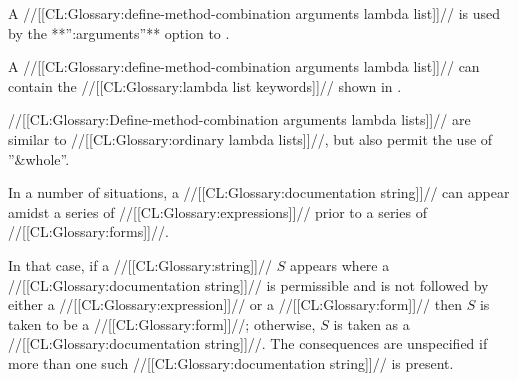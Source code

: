 \endsubsection%



A //[[CL:Glossary:define-method-combination arguments lambda list]]// is used by 
the **'':arguments''** option to .

A //[[CL:Glossary:define-method-combination arguments lambda list]]// can contain the 
//[[CL:Glossary:lambda list keywords]]// shown in \thenextfigure.


//[[CL:Glossary:Define-method-combination arguments lambda lists]]// are similar to 
//[[CL:Glossary:ordinary lambda lists]]//, but also permit the use of ''&whole''.

\endsubsection%




In a number of situations, a //[[CL:Glossary:documentation string]]// can appear amidst a
series of  //[[CL:Glossary:expressions]]// prior to a series of //[[CL:Glossary:forms]]//.

In that case, if a //[[CL:Glossary:string]]// $S$ appears where a //[[CL:Glossary:documentation string]]// is
permissible and is not followed by 
  either a  //[[CL:Glossary:expression]]// 
      or a //[[CL:Glossary:form]]//
then $S$ is taken to be a //[[CL:Glossary:form]]//;
otherwise, $S$ is taken as a //[[CL:Glossary:documentation string]]//.
The consequences are unspecified if more than one such //[[CL:Glossary:documentation string]]// 
is present.

\endsubsection%
